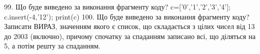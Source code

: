 \documentclass[11pt]{article}
\begin{document}
99. Що буде виведено за виконання фрагменту коду?
c=['0','1','2','3','4']; c.insert(-4,'12'); print(c)
100. Що буде виведено за виконання фрагменту коду?
Записати ВИРАЗ, значенням якого є список, що складається з цілих чисел від 13 до 2003 (включно), причому спочатку за спаданням записано всі, що діляться на 5, а потім решту за спаданням.




































































































\newpage
\end{document}
